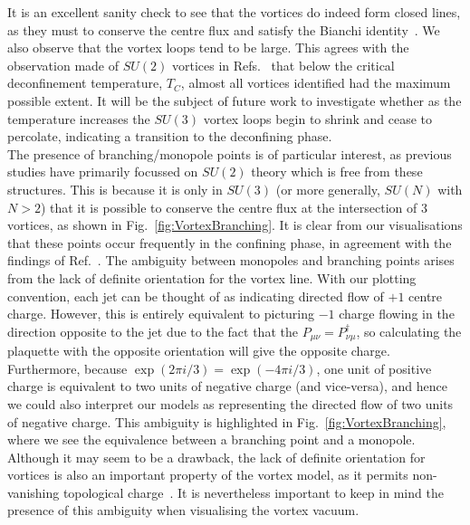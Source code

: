 It is an excellent sanity check to see that the vortices do indeed form closed lines, as they must to conserve the centre flux and satisfy the Bianchi identity~\cite{Engelhardt:2003wm,Spengler:2018dxt}. We also observe that the vortex loops tend to be large. This agrees with the observation made of $SU(2)$ vortices in Refs.~\cite{Engelhardt:1999fd,Bertle:1999tw} that below the critical deconfinement temperature, $T_C$, almost all vortices identified had the maximum possible extent. It will be the subject of future work to investigate whether as the temperature increases the $SU(3)$ vortex loops begin to shrink and cease to percolate, indicating a transition to the deconfining phase.\\

The presence of branching/monopole points is of particular interest, as previous studies have primarily focussed on $SU(2)$ theory which is free from these structures. This is because it is only in $SU(3)$ (or more generally, $SU(N)$ with $N>2$) that it is possible to conserve the centre flux at the intersection of 3 vortices, as shown in Fig.~\ref{fig:VortexBranching}. It is clear from our visualisations that these points occur frequently in the confining phase, in agreement with the findings of Ref.~\cite{Spengler:2018dxt}. The ambiguity between monopoles and branching points arises from the lack of definite orientation for the vortex line. With our plotting convention, each jet can be thought of as indicating directed flow of $+1$ centre charge. However, this is entirely equivalent to picturing $-1$ charge flowing in the direction opposite to the jet due to the fact that the $P_{\mu\nu} = P_{\nu\mu}^\dagger$, so calculating the plaquette with the opposite orientation will give the opposite charge. Furthermore, because $\exp(2\pi i/3) = \exp(-4\pi i/3)$, one unit of positive charge is equivalent to two units of negative charge (and vice-versa), and hence we could also interpret our models as representing the directed flow of two units of negative charge. This ambiguity is highlighted in Fig.~\ref{fig:VortexBranching}, where we see the equivalence between a branching point and a monopole.  Although it may seem to be a drawback, the lack of definite orientation for vortices is also an important property of the vortex model, as it permits non-vanishing topological charge~\cite{Engelhardt:2010ft,Engelhardt:1999xw}. It is nevertheless important to keep in mind the presence of this ambiguity when visualising the vortex vacuum.
%
